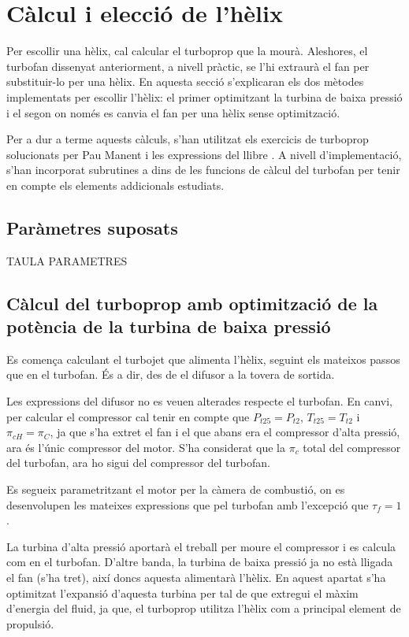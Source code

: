 \clearpage
\section{Càlcul i elecció de l'hèlix}
Per escollir una hèlix, cal calcular el turboprop que la mourà. Aleshores, el turbofan dissenyat anteriorment, a nivell pràctic, se l'hi extraurà el fan per substituir-lo per una hèlix. En aquesta secció s'explicaran els dos mètodes implementats per escollir l'hèlix: el primer optimitzant la turbina de baixa pressió i el segon on només es canvia el fan per una hèlix sense optimització.

\noindent Per a dur a terme aquests càlculs, s'han utilitzat els exercicis de turboprop solucionats per Pau Manent i les expressions del llibre \cite{mattingly}. A nivell d'implementació, s'han incorporat subrutines a dins de les funcions de càlcul del turbofan per tenir en compte els elements addicionals estudiats.
\subsection{Paràmetres suposats}

TAULA PARAMETRES

\subsection{Càlcul del turboprop amb optimització de la potència de la turbina de baixa pressió}
Es comença calculant el turbojet que alimenta l'hèlix, seguint els mateixos passos que en el turbofan. És a dir, des de el difusor a la tovera de sortida.

\noindent Les expressions del difusor no es veuen alterades respecte el turbofan. En canvi, per calcular el compressor cal tenir en compte que $P_{t25}=P_{t2}$, $T_{t25}=T_{t2}$ i $\pi_{cH}=\pi_{C}$, ja que s'ha extret el fan i el que abans era el compressor d'alta pressió, ara és l'únic compressor del motor. S'ha considerat que la $\pi_c$ total del compressor del turbofan, ara ho sigui del compressor del turbofan.

\noindent Es segueix parametritzant el motor per la càmera de combustió, on es desenvolupen les mateixes expressions que pel turbofan amb l'excepció que $\tau_f=1$.

\noindent La turbina d'alta pressió aportarà el treball per moure el compressor i es calcula com en el turbofan. D'altre banda, la turbina de baixa pressió ja no està lligada el fan (s'ha tret), així doncs aquesta alimentarà l'hèlix. En aquest apartat s'ha optimitzat l'expansió d'aquesta turbina per tal de que extregui el màxim d'energia del fluid, ja que, el turboprop utilitza l'hèlix com a principal element de propulsió. 

